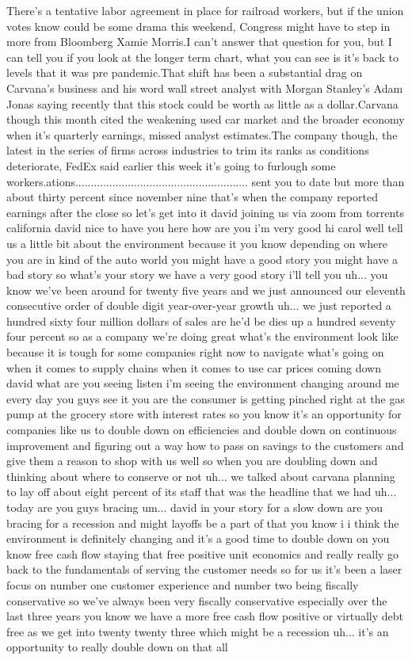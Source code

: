 \documentclass{article}%
\begin{document}
There's a tentative labor agreement in place for railroad workers, but if the union votes know could be some drama this weekend, Congress might have to step in more from Bloomberg Xamie Morris.I can't answer that question for you, but I can tell you if you look at the longer term chart, what you can see is it's back to levels that it was pre pandemic.That shift has been a substantial drag on Carvana's business and his word wall street analyst with Morgan Stanley's Adam Jonas saying recently that this stock could be worth as little as a dollar.Carvana though this month cited the weakening used car market and the broader economy when it's quarterly earnings, missed analyst estimates.The company though, the latest in the series of firms across industries to trim its ranks as conditions deteriorate, FedEx said earlier this week it's going to furlough some workers.ations........................................................  sent you to date but more than about thirty percent since november nine that's when the company reported earnings after the close so let's get into it david joining us via zoom from torrents california david nice to have you here how are you i'm very good hi carol well tell us a little bit about the environment because it you know depending on where you are in kind of the auto world you might have a good story you might have a bad story so what's your story we have a very good story i'll tell you uh... you know we've been around for twenty five years and we just announced our eleventh consecutive order of double digit year{-}over{-}year growth uh... we just reported a hundred sixty four million dollars of sales are he'd be dies up a hundred seventy four percent so as a company we're doing great what's the environment look like because it is tough for some companies right now to navigate what's going on when it comes to supply chains when it comes to use car prices coming down david what are you seeing listen i'm seeing the environment changing around me every day you guys see it you are the consumer is getting pinched right at the gas pump at the grocery store with interest rates so you know it's an opportunity for companies like us to double down on efficiencies and double down on continuous improvement and figuring out a way how to pass on savings to the customers and give them a reason to shop with us well so when you are doubling down and thinking about where to conserve or not uh... we talked about carvana planning to lay off about eight percent of its staff that was the headline that we had uh... today are you guys bracing um... david in your story for a slow down are you bracing for a recession and might layoffs be a part of that you know i i think the environment is definitely changing and it's a good time to double down on you know free cash flow staying that free positive unit economics and really really go back to the fundamentals of serving the customer needs so for us it's been a laser focus on number one customer experience and number two being fiscally conservative so we've always been very fiscally conservative especially over the last three years you know we have a more free cash flow positive or virtually debt free as we get into twenty twenty three which might be a recession uh... it's an opportunity to really double down on that all 
\end{document}
